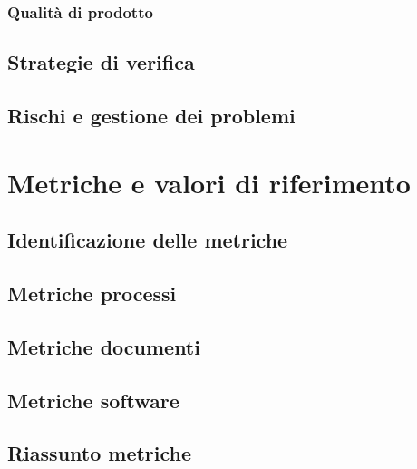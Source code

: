 \documentclass[a4paper, oneside, openany, dvipsnames, table]{article}
\begin{document}
		\subsubsection{Qualità di prodotto}
		
	\subsection{Strategie di verifica}
	
	\subsection{Rischi e gestione dei problemi}
	
	\newpage

\section{Metriche e valori di riferimento}
\label{sec:metriche}
	\subsection{Identificazione delle metriche}
		
		\subsection{Metriche processi}
		
		\subsection{Metriche documenti}
		
		\subsection{Metriche software}
		
		\newpage
	\subsection{Riassunto metriche}
	
		
\end{document}

